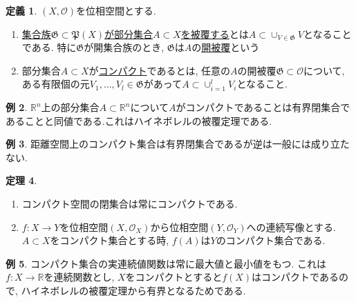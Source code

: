 \documentclass[dvipdfmx,a4paper,11pt]{article}
\newcommand{\R}{\mathbb{R}}
\theoremstyle{definition}
\newtheorem{thm}{定理}
\newtheorem{dfn}[thm]{定義}
\newtheorem{exa}[thm]{例}
\begin{document}
  \begin{tcolorbox}[
    colback = white,
    colframe = green!35!black,
    fonttitle = \bfseries,
    breakable = true]
    \begin{dfn}
    $(X, \mathscr{O})$を位相空間とする.
    \begin{enumerate}
    \item \underline{集合族$\mathfrak{G} \subset \mathfrak{P}(X)$が部分集合$A \subset X$を被覆する}とは$A \subset \cup_{V \in \mathfrak{G}}V$となることである. 特に$\mathfrak{G} $が開集合族のとき, $\mathfrak{G}$は$A$の\underline{開被覆}という
    \item 部分集合$A \subset X$が\underline{コンパクト}であるとは, 任意の$A$の開被覆$\mathfrak{G} \subset \mathscr{O}$について, ある有限個の元$V_1, \ldots, V_l \in \mathfrak{G}$があって$A \subset \cup_{i=1}^{l} V_i$となること.
    \end{enumerate}
  \end{dfn}
 \end{tcolorbox}
 \begin{exa}
$\R^n$上の部分集合$A \subset \R^n$について$A$がコンパクトであることは有界閉集合であることと同値である.これはハイネボレルの被覆定理である. 
 \end{exa}
  \begin{exa}
距離空間上のコンパクト集合は有界閉集合であるが逆は一般には成り立たない.
 \end{exa}
 
  \begin{tcolorbox}[
    colback = white,
    colframe = green!35!black,
    fonttitle = \bfseries,
    breakable = true]
    \begin{thm}
    \text{}
    \begin{enumerate}
     \setlength{\parskip}{0cm} 
  \setlength{\itemsep}{0cm} 
    \item コンパクト空間の閉集合は常にコンパクトである.
    \item $f : X\rightarrow Y$を位相空間$(X, \mathscr{O}_X)$から位相空間$(Y, \mathscr{O}_Y)$への連続写像とする.
    $A \subset X$をコンパクト集合とする時, $f(A)$は$Y$のコンパクト集合である.
    \end{enumerate}
  \end{thm}
 \end{tcolorbox}
  \begin{exa}
コンパクト集合の実連続値関数は常に最大値と最小値をもつ. これは$f: X \rightarrow \R$を連続関数とし, $X$をコンパクトとすると$f(X)$はコンパクトであるので, ハイネボレルの被覆定理から有界となるためである.
 \end{exa}
 
\end{document}
